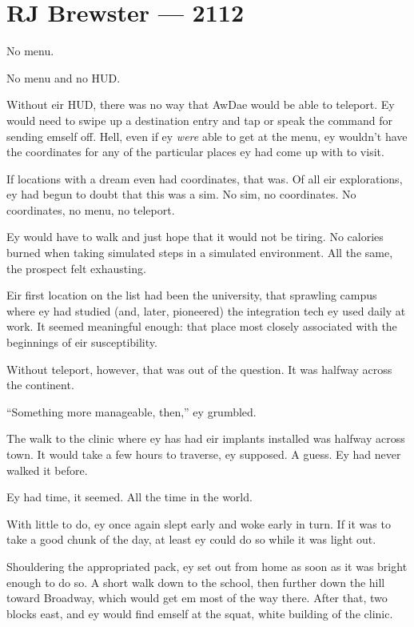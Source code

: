 \hypertarget{rj-brewster-2112}{%
\chapter*{RJ Brewster — 2112}\label{rj-brewster-2112}}

No menu.

No menu and no HUD.

Without eir HUD, there was no way that AwDae would be able to teleport. Ey would need to swipe up a destination entry and tap or speak the command for sending emself off. Hell, even if ey \emph{were} able to get at the menu, ey wouldn't have the coordinates for any of the particular places ey had come up with to visit.

If locations with a dream even had coordinates, that was. Of all eir explorations, ey had begun to doubt that this was a sim. No sim, no coordinates. No coordinates, no menu, no teleport.

Ey would have to walk and just hope that it would not be tiring. No calories burned when taking simulated steps in a simulated environment. All the same, the prospect felt exhausting.

Eir first location on the list had been the university, that sprawling campus where ey had studied (and, later, pioneered) the integration tech ey used daily at work. It seemed meaningful enough: that place most closely associated with the beginnings of eir susceptibility.

Without teleport, however, that was out of the question. It was halfway across the continent.

``Something more manageable, then,'' ey grumbled.

The walk to the clinic where ey has had eir implants installed was halfway across town. It would take a few hours to traverse, ey supposed. A guess. Ey had never walked it before.

Ey had time, it seemed. All the time in the world.

With little to do, ey once again slept early and woke early in turn. If it was to take a good chunk of the day, at least ey could do so while it was light out.

Shouldering the appropriated pack, ey set out from home as soon as it was bright enough to do so. A short walk down to the school, then further down the hill toward Broadway, which would get em most of the way there. After that, two blocks east, and ey would find emself at the squat, white building of the clinic.


